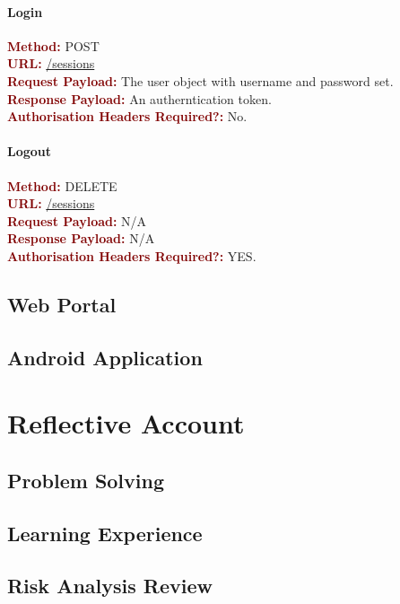 \documentclass[11pt,a4paper]{report}
\begin{document}
\subsubsection{Login}
\textbf{\textcolor{Maroon}{Method:}} POST\\
\textbf{\textcolor{Maroon}{URL:}} \url{/sessions}\\
\textbf{\textcolor{Maroon}{Request Payload:}} The user object with username and password set.\\
\textbf{\textcolor{Maroon}{Response Payload:}} An autherntication token.\\
\textbf{\textcolor{Maroon}{Authorisation Headers Required?:}} No.

\subsubsection{Logout}
\textbf{\textcolor{Maroon}{Method:}} DELETE\\
\textbf{\textcolor{Maroon}{URL:}} \url{/sessions}\\
\textbf{\textcolor{Maroon}{Request Payload:}} N/A\\
\textbf{\textcolor{Maroon}{Response Payload:}} N/A\\
\textbf{\textcolor{Maroon}{Authorisation Headers Required?:}} YES.


\section{Web Portal}

\section{Android Application}

\chapter{Reflective Account}
\label{sec:reflective-account}
\section{Problem Solving}
\label{sec:problem-solving}
\section{Learning Experience}
\label{sec:learning-experience}
\section{Risk Analysis Review}
\label{sec:risk-analysis-review}
\end{document}
